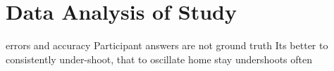 \section{Data Analysis of Study}
errors and accuracy 
Participant answers are not ground truth
Its better to consistently under-shoot, that to oscillate
home stay undershoots often